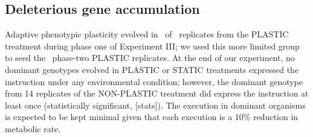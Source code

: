 \vspace{0.5cm}
\subsection{Deleterious gene accumulation}


Adaptive phenotypic plasticity evolved in \deleteriousHitchhikingPlasticReps\ of \deleteriousHitchhikingReplicates\ replicates from the PLASTIC treatment during phase one of Experiment III; we used this more limited group to seed the \deleteriousHitchhikingPlasticReps\ phase-two PLASTIC replicates.
At the end of our experiment, no dominant genotypes evolved in PLASTIC or STATIC treatments expressed the  instruction under any environmental condition; however, the dominant genotype from 14 replicates of the NON-PLASTIC treatment did express the  instruction at least once (statistically significant, [stats]).
The  execution in dominant organisms is expected to be kept minimal given that each execution is a 10\% reduction in metabolic rate.




